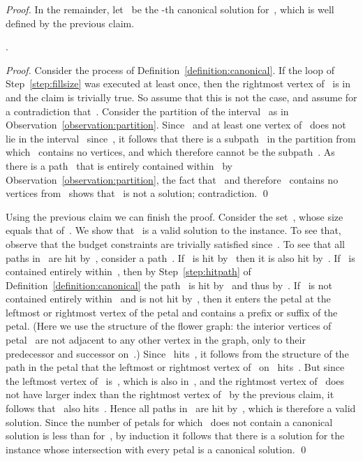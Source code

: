 \let\accentvec\vec  \documentclass{llncs}
\newcommand{\claimqed}{\renewcommand{\squareforqed}{}\qed\renewcommand{\squareforqed}{\plainsquareforqed}}
\begin{document}
\begin{proof}
In the remainder, let~ be the -th canonical solution for~, which is well defined by the previous claim.

\begin{claim}
.
\end{claim}
\begin{proof}
Consider the process of Definition~\ref{definition:canonical}. If the loop of Step~\ref{step:fillsize} was executed at least once, then the rightmost vertex of~ is in~ and the claim is trivially true. So assume that this is not the case, and assume for a contradiction that~. Consider the partition of the interval~ as in Observation~\ref{observation:partition}. Since~ and at least one vertex of~ does not lie in the interval~ since~, it follows that there is a subpath~ in the partition from which~ contains no vertices, and which therefore cannot be the subpath~. As there is a path~ that is entirely contained within~ by Observation~\ref{observation:partition}, the fact that~ and therefore~ contains no vertices from~ shows that~ is not a solution; contradiction.
\claimqed
\end{proof}

Using the previous claim we can finish the proof. Consider the set~, whose size equals that of~. We show that~ is a valid solution to the instance. To see that, observe that the budget constraints are trivially satisfied since~. To see that all paths in~ are hit by~, consider a path~. If~ is hit by~ then it is also hit by~. If~ is contained entirely within~, then by Step~\ref{step:hitpath} of Definition~\ref{definition:canonical} the path~ is hit by~ and thus by~. If~ is not contained entirely within~ and is not hit by~, then it enters the petal at the leftmost or rightmost vertex of the petal and contains a prefix or suffix of the petal. (Here we use the structure of the flower graph: the interior vertices of petal~ are not adjacent to any other vertex in the graph, only to their predecessor and successor on~.) Since~ hits~, it follows from the structure of the path in the petal that the leftmost or rightmost vertex of~ on~ hits~. But since the leftmost vertex of~ is~, which is also in~, and the rightmost vertex of~ does not have larger index than the rightmost vertex of~ by the previous claim, it follows that~ also hits~. Hence all paths in~ are hit by~, which is therefore a valid solution. Since the number of petals for which~ does not contain a canonical solution is less than for~, by induction it follows that there is a solution for the instance whose intersection with every petal is a canonical solution.
\qed
\end{proof}
\end{document}

